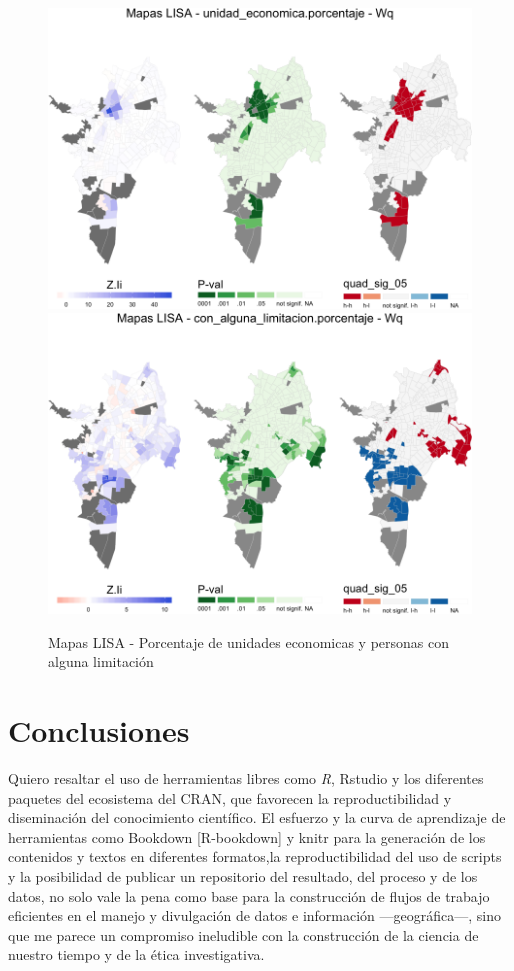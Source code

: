 \documentclass[12pt,]{book}
\begin{document}
\begin{figure}
\includegraphics[width=1\linewidth]{tesis-unigis_files/figure-latex/lisa-areaep-ue-cal-1} \includegraphics[width=1\linewidth]{tesis-unigis_files/figure-latex/lisa-areaep-ue-cal-2} \caption{Mapas LISA - Porcentaje de unidades economicas y personas con alguna limitación }\label{fig:lisa-areaep-ue-cal}
\end{figure}

\chapter{Conclusiones}\label{conclusiones}

Quiero resaltar el uso de herramientas libres como \emph{R}, Rstudio y
los diferentes paquetes del ecosistema del CRAN, que favorecen la
reproductibilidad y diseminación del conocimiento científico. El
esfuerzo y la curva de aprendizaje de herramientas como Bookdown
{[}R-bookdown{]} y knitr \citep{R-knitr} para la generación de los
contenidos y textos en diferentes formatos,la reproductibilidad del uso
de scripts y la posibilidad de publicar un repositorio del resultado,
del proceso y de los datos, no solo vale la pena como base para la
construcción de flujos de trabajo eficientes en el manejo y divulgación
de datos e información ---geográfica---, sino que me parece un
compromiso ineludible con la construcción de la ciencia de nuestro
tiempo y de la ética investigativa.
\end{document}
